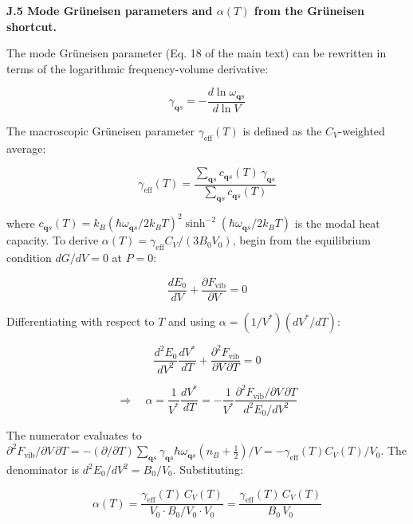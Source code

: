 \documentclass[aps,prb,reprint,amsmath,amssymb,floatfix]{revtex4-2}
\begin{document}
\textbf{J.5 Mode Grüneisen parameters and \(\alpha(T)\) from the
Grüneisen shortcut.}

The mode Grüneisen parameter (Eq. 18 of the main text) can be rewritten
in terms of the logarithmic frequency-volume derivative:

\begin{equation*}
\gamma_{\mathbf{q}s} = -\frac{d\ln\omega_{\mathbf{q}s}}{d\ln V}
\end{equation*}

The macroscopic Grüneisen parameter \(\gamma_\text{eff}(T)\) is defined
as the \(C_V\)-weighted average:

\begin{equation*}
\gamma_\text{eff}(T) = \frac{\sum_{\mathbf{q}s} c_{\mathbf{q}s}(T)\,\gamma_{\mathbf{q}s}}{\sum_{\mathbf{q}s} c_{\mathbf{q}s}(T)}
\end{equation*}

where
\(c_{\mathbf{q}s}(T) = k_B(\hbar\omega_{\mathbf{q}s}/2k_BT)^2\sinh^{-2}(\hbar\omega_{\mathbf{q}s}/2k_BT)\)
is the modal heat capacity. To derive
\(\alpha(T) = \gamma_\text{eff} C_V/(3B_0 V_0)\), begin from the
equilibrium condition \(dG/dV = 0\) at \(P = 0\):

\begin{equation*}
\frac{dE_0}{dV} + \frac{\partial F_\text{vib}}{\partial V} = 0
\end{equation*}

Differentiating with respect to \(T\) and using
\(\alpha = (1/V^*)(dV^*/dT)\):

\begin{equation*}
\frac{d^2E_0}{dV^2}\frac{dV^*}{dT} + \frac{\partial^2 F_\text{vib}}{\partial V\,\partial T} = 0
\end{equation*}

\begin{equation*}
\Rightarrow\quad \alpha = \frac{1}{V^*}\frac{dV^*}{dT} = -\frac{1}{V^*}\frac{\partial^2 F_\text{vib}/\partial V\,\partial T}{d^2E_0/dV^2}
\end{equation*}

The numerator evaluates to
\(\partial^2 F_\text{vib}/\partial V\,\partial T = -(\partial/\partial T)\sum_{\mathbf{q}s}\gamma_{\mathbf{q}s}\hbar\omega_{\mathbf{q}s}(n_B+\tfrac{1}{2})/V = -\gamma_\text{eff}(T)C_V(T)/V_0\).
The denominator is \(d^2E_0/dV^2 = B_0/V_0\). Substituting:

\begin{equation*}
\alpha(T) = \frac{\gamma_\text{eff}(T)\,C_V(T)}{V_0\cdot B_0/V_0\cdot V_0} = \frac{\gamma_\text{eff}(T)\,C_V(T)}{B_0\,V_0}
\end{equation*}
\end{document}
